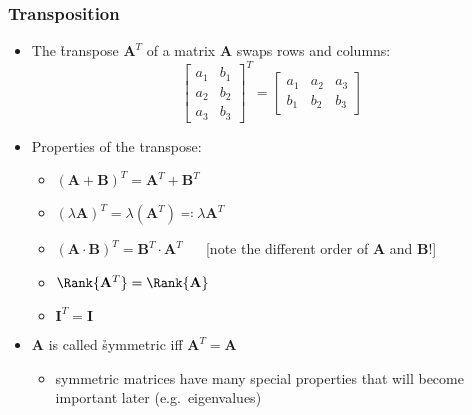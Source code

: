\begin{frame}
  \frametitle{Transposition}

  \begin{itemize}
  \item The \h{transpose} $\mathbf{A}^T$ of a matrix $\mathbf{A}$ swaps rows and columns:
    \[
    \begin{bmatrix}
      a_1 & b_1 \\
      a_2 & b_2 \\
      a_3 & b_3 
    \end{bmatrix}^T
    =
    \begin{bmatrix}
      a_1 & a_2 & a_3 \\
      b_1 & b_2 & b_3
    \end{bmatrix}
    \]
    \pause
  \item Properties of the transpose: 
    \begin{itemize}
    \item $(\mathbf{A} + \mathbf{B})^T = \mathbf{A}^T + \mathbf{B}^T$
    \item $(\lambda \mathbf{A})^T = \lambda (\mathbf{A}^T) \eqcolon \lambda \mathbf{A}^T$
    \item $(\mathbf{A}\cdot \mathbf{B})^T = \mathbf{B}^T\cdot \mathbf{A}^T$
      $\quad$ [note the different order of $\mathbf{A}$ and $\mathbf{B}$!]
    \item $\Rank{\mathbf{A}^T} = \Rank{\mathbf{A}}$
    \item $\mathbf{I}^T = \mathbf{I}$
    \end{itemize}
    \pause
  \item $\mathbf{A}$ is called \h{symmetric} iff $\mathbf{A}^T = \mathbf{A}$
    \begin{itemize}
    \item symmetric matrices have many special properties that will become
      important later (e.g.\ eigenvalues)
    \end{itemize}
  \end{itemize}
\end{frame}

